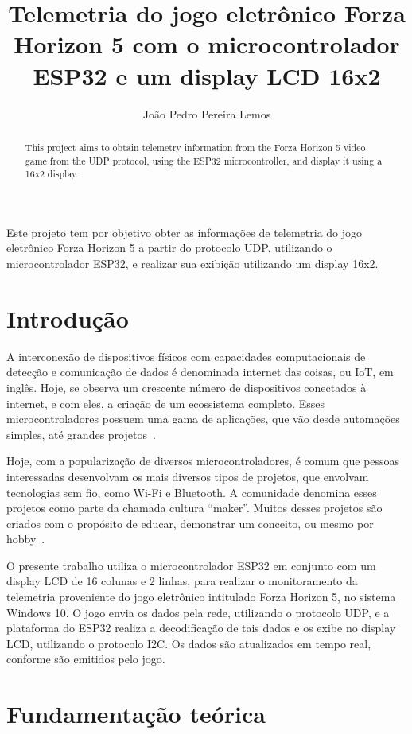 \documentclass[12pt]{article}
\title{Telemetria do jogo eletrônico Forza Horizon 5 com o microcontrolador ESP32 e um display LCD 16x2}
\author{João Pedro Pereira Lemos\inst{1}}
\begin{document}
\maketitle

\begin{abstract}
  This project aims to obtain telemetry information from the Forza Horizon 5 video game
  from the UDP protocol, using the ESP32 microcontroller, and display it using a 16x2 display.
\end{abstract}

\begin{resumo}
  Este projeto tem por objetivo obter as informações de telemetria do jogo eletrônico
  Forza Horizon 5 a partir do protocolo UDP, utilizando o microcontrolador ESP32,
  e realizar sua exibição utilizando um display 16x2.
\end{resumo}

\section{Introdução}

A interconexão de dispositivos físicos com capacidades computacionais de detecção e comunicação
de dados é denominada internet das coisas, ou IoT, em inglês. Hoje, se observa um crescente número
de dispositivos conectados à internet, e com eles, a criação de um ecossistema completo.
Esses microcontroladores possuem uma  gama de aplicações, que vão desde automações simples,
até grandes projetos~\cite{carrion}.

Hoje, com a popularização de diversos microcontroladores, é comum que pessoas interessadas desenvolvam
os mais diversos tipos de projetos, que envolvam tecnologias sem fio, como Wi-Fi e Bluetooth.
A comunidade denomina esses projetos como parte da chamada cultura “maker”.
Muitos desses projetos são criados com o propósito de educar, demonstrar um conceito, ou mesmo por hobby~\cite{gavassa}.

O presente trabalho utiliza o microcontrolador ESP32 em conjunto com um display LCD de 16 colunas e 2 linhas,
para realizar o monitoramento da telemetria proveniente do jogo eletrônico intitulado Forza Horizon 5, no sistema Windows 10.
O jogo envia os dados pela rede, utilizando o protocolo UDP, e a plataforma do ESP32 realiza a decodificação de tais dados
e os exibe no display LCD, utilizando o protocolo I2C.
Os dados são atualizados em tempo real, conforme são emitidos pelo jogo.

\section{Fundamentação teórica}
\end{document}
